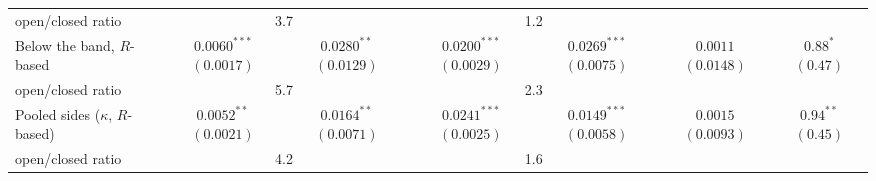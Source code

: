\begin{tabular}{lcccccc}
\quad open/closed ratio & \multicolumn{2}{c}{3.7} & \multicolumn{2}{c}{1.2} & & \\
Below the band, $R$-based & $0.0060^{***}$ $(0.0017)$ & $0.0280^{**}$ $(0.0129)$ & $0.0200^{***}$ $(0.0029)$ & $0.0269^{***}$ $(0.0075)$ & $0.0011$ $(0.0148)$ & $0.88^{*}$ $(0.47)$ \\
\quad open/closed ratio & \multicolumn{2}{c}{5.7} & \multicolumn{2}{c}{2.3} & & \\
Pooled sides ($\kappa$, $R$-based) & $0.0052^{**}$ $(0.0021)$ & $0.0164^{**}$ $(0.0071)$ & $0.0241^{***}$ $(0.0025)$ & $0.0149^{***}$ $(0.0058)$ & $0.0015$ $(0.0093)$ & $0.94^{**}$ $(0.45)$ \\
\quad open/closed ratio & \multicolumn{2}{c}{4.2} & \multicolumn{2}{c}{1.6} & & \\
\bottomrule
\end{tabular}
